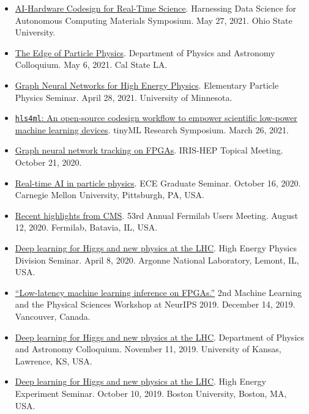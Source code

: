 \documentclass[11pt]{res}
\begin{document}
\begin{resume}
\begin{itemize}
    \item \href{https://tdai.osu.edu/events/acm-symposium-harnessing-data-science-autonomous-computing-materials}{AI-Hardware Codesign for Real-Time Science}. Harnessing Data Science for Autonomous Computing Materials Symposium. May 27, 2021. Ohio State University.
    \item \href{https://www.calstatela.edu/dept/physics/colloquia-and-events}{The Edge of Particle Physics}. Department of Physics and Astronomy Colloquium. May 6, 2021. Cal State LA.
    \item \href{https://cse.umn.edu/physics/elementary-particle-physics-elem-part-phys-seminar}{Graph Neural Networks for High Energy Physics}. Elementary Particle Physics Seminar. April 28, 2021. University of Minnesota.
    \item \href{https://www.tinyml.org/event/research-symposium-2021/}{\texttt{hls4ml}: An open-source codesign workflow to empower scientific low-power machine learning devices}. tinyML Research Symposium. March 26, 2021.
    \item \href{https://indico.cern.ch/event/955026/}{Graph neural network tracking on FPGAs}. IRIS-HEP Topical Meeting. October 21, 2020.
    \item \href{https://www.cs.cmu.edu/calendar/fri-2020-10-16-1200/ece-graduate-seminar}{Real-time AI in particle physics}. ECE Graduate Seminar. October 16, 2020. Carnegie Mellon University, Pittsburgh, PA, USA.
    \item \href{https://indico.fnal.gov/event/23109/contributions/193292/}{Recent highlights from CMS}. 53rd Annual Fermilab Users Meeting. August 12, 2020. Fermilab, Batavia, IL, USA.
    \item \href{https://indico.fnal.gov/event/22961/}{Deep learning for Higgs and new physics at the LHC}. High Energy Physics Division Seminar. April 8, 2020. Argonne National Laboratory, Lemont, IL, USA.
    \item \href{https://ml4physicalsciences.github.io/2019/files/NeurIPS_ML4PS_2019_74.pdf}{``Low-latency machine learning inference on FPGAs.''} 2nd Machine Learning and the Physical Sciences Workshop at NeurIPS 2019.  December 14, 2019. Vancouver, Canada.
    \item \href{https://physics.drupal.ku.edu/calendar/colloquia#/?i=2}{Deep learning for Higgs and new physics at the LHC}. Department of Physics and Astronomy Colloquium. November 11, 2019. University of Kansas, Lawrence, KS, USA.
    \item \href{http://physics.bu.edu/events/show/2204}{Deep learning for Higgs and new physics at the LHC}. High Energy Experiment Seminar. October 10, 2019. Boston University, Boston, MA, USA.

\end{itemize}
\end{resume}
\end{document}
